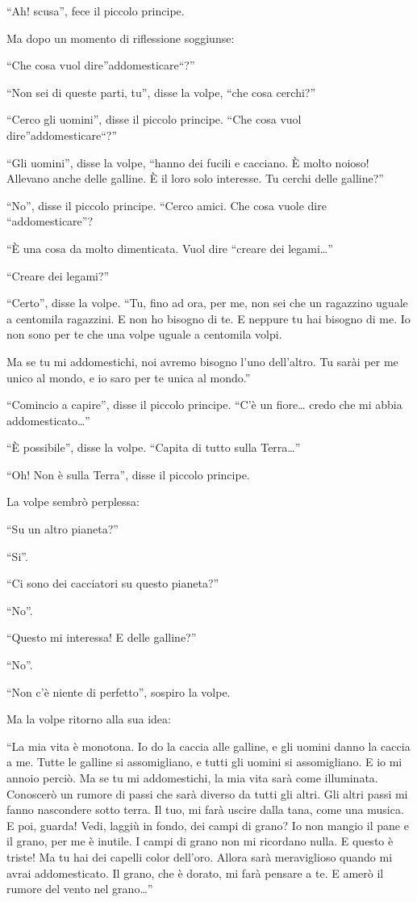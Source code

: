\documentclass[11pt]{scrbook}
\begin{document}
``Ah! scusa'', fece il piccolo principe.

Ma dopo un momento di riflessione soggiunse:

``Che cosa vuol dire''addomesticare``?''

``Non sei di queste parti, tu'', disse la volpe, ``che cosa cerchi?''

``Cerco gli uomini'', disse il piccolo principe. ``Che cosa vuol dire''addomesticare``?''

``Gli uomini'', disse la volpe, ``hanno dei fucili e cacciano. È molto noioso! Allevano anche delle galline. È il loro solo interesse. Tu cerchi delle galline?''

``No'', disse il piccolo principe. ``Cerco amici. Che cosa vuole dire ``addomesticare''?

``È una cosa da molto dimenticata. Vuol dire ``creare dei legami\ldots{}''

``Creare dei legami?''

``Certo'', disse la volpe. ``Tu, fino ad ora, per me, non sei che un ragazzino uguale a centomila ragazzini. E non ho bisogno di te. E neppure tu hai bisogno di me. Io non sono per te che una volpe uguale a centomila volpi.

Ma se tu mi addomestichi, noi avremo bisogno l'uno dell'altro. Tu sarài per me unico al mondo, e io saro per te unica al mondo.''

``Comincio a capire'', disse il piccolo principe. ``C'è un fiore\ldots{} credo che mi abbia addomesticato\ldots{}''

``È possibile'', disse la volpe. ``Capita di tutto sulla Terra\ldots{}''

``Oh! Non è sulla Terra'', disse il piccolo principe.

La volpe sembrò perplessa:

``Su un altro pianeta?''

``Si''.

``Ci sono dei cacciatori su questo pianeta?''

``No''.

``Questo mi interessa! E delle galline?''

``No''.

``Non c'è niente di perfetto'', sospiro la volpe.

Ma la volpe ritorno alla sua idea:

``La mia vita è monotona. Io do la caccia alle galline, e gli uomini danno la caccia a me. Tutte le galline si assomigliano, e tutti gli uomini si assomigliano. E io mi annoio perciò. Ma se tu mi addomestichi, la mia vita sarà come illuminata. Conoscerò un rumore di passi che sarà diverso da tutti gli altri. Gli altri passi mi fanno nascondere sotto terra. Il tuo, mi farà uscire dalla tana, come una musica. E poi, guarda! Vedi, laggiù in fondo, dei campi di grano? Io non mangio il pane e il grano, per me è inutile. I campi di grano non mi ricordano nulla. E questo è triste! Ma tu hai dei capelli color dell'oro. Allora sarà meraviglioso quando mi avrai addomesticato. Il grano, che è dorato, mi farà pensare a te. E amerò il rumore del vento nel grano\ldots{}''
\end{document}
